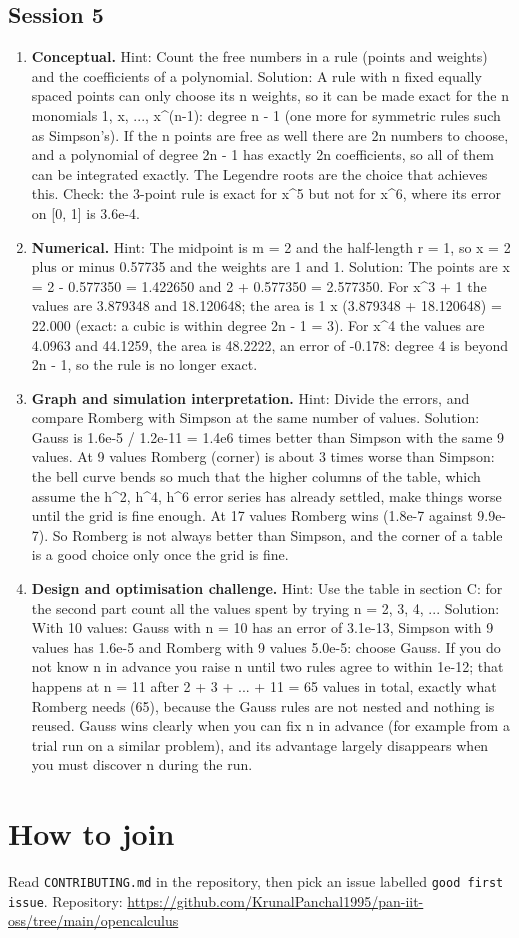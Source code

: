 \documentclass[11pt,a4paper]{article}
\begin{document}
\subsection*{Session 5}
\begin{enumerate}[nosep]
\item \textbf{Conceptual.} Hint: Count the free numbers in a rule (points and weights) and the coefficients of a polynomial. Solution: A rule with n fixed equally spaced points can only choose its n weights, so it can be made exact for the n monomials 1, x, ..., x\textasciicircum{}(n-1): degree n - 1 (one more for symmetric rules such as Simpson's). If the n points are free as well there are 2n numbers to choose, and a polynomial of degree 2n - 1 has exactly 2n coefficients, so all of them can be integrated exactly. The Legendre roots are the choice that achieves this. Check: the 3-point rule is exact for x\textasciicircum{}5 but not for x\textasciicircum{}6, where its error on [0, 1] is 3.6e-4.
\item \textbf{Numerical.} Hint: The midpoint is m = 2 and the half-length r = 1, so x = 2 plus or minus 0.57735 and the weights are 1 and 1. Solution: The points are x = 2 - 0.577350 = 1.422650 and 2 + 0.577350 = 2.577350. For x\textasciicircum{}3 + 1 the values are 3.879348 and 18.120648; the area is 1 x (3.879348 + 18.120648) = 22.000 (exact: a cubic is within degree 2n - 1 = 3). For x\textasciicircum{}4 the values are 4.0963 and 44.1259, the area is 48.2222, an error of -0.178: degree 4 is beyond 2n - 1, so the rule is no longer exact.
\item \textbf{Graph and simulation interpretation.} Hint: Divide the errors, and compare Romberg with Simpson at the same number of values. Solution: Gauss is 1.6e-5 / 1.2e-11 = 1.4e6 times better than Simpson with the same 9 values. At 9 values Romberg (corner) is about 3 times worse than Simpson: the bell curve bends so much that the higher columns of the table, which assume the h\textasciicircum{}2, h\textasciicircum{}4, h\textasciicircum{}6 error series has already settled, make things worse until the grid is fine enough. At 17 values Romberg wins (1.8e-7 against 9.9e-7). So Romberg is not always better than Simpson, and the corner of a table is a good choice only once the grid is fine.
\item \textbf{Design and optimisation challenge.} Hint: Use the table in section C: for the second part count all the values spent by trying n = 2, 3, 4, ... Solution: With 10 values: Gauss with n = 10 has an error of 3.1e-13, Simpson with 9 values has 1.6e-5 and Romberg with 9 values 5.0e-5: choose Gauss. If you do not know n in advance you raise n until two rules agree to within 1e-12; that happens at n = 11 after 2 + 3 + ... + 11 = 65 values in total, exactly what Romberg needs (65), because the Gauss rules are not nested and nothing is reused. Gauss wins clearly when you can fix n in advance (for example from a trial run on a similar problem), and its advantage largely disappears when you must discover n during the run.
\end{enumerate}

\section{How to join}
Read \texttt{CONTRIBUTING.md} in the repository, then pick an issue labelled \texttt{good first issue}. Repository: \url{https://github.com/KrunalPanchal1995/pan-iit-oss/tree/main/opencalculus}
\end{document}

